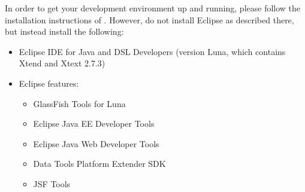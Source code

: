 
\label{sec:dev-install}

In order to get your development environment up and running, please follow the installation instructions of  . However, do not install Eclipse as described there, but instead install the following:

\begin{itemize}
\item Eclipse IDE for Java and DSL Developers (\eg version Luna, which contains Xtend and Xtext 2.7.3)
\item Eclipse features:
\begin{itemize}
	\item GlassFish Tools for Luna
	\item Eclipse Java EE Developer Tools
	\item Eclipse Java Web Developer Tools
	\item Data Tools Platform Extender SDK
	\item JSF Tools
\end{itemize}
\end{itemize}
